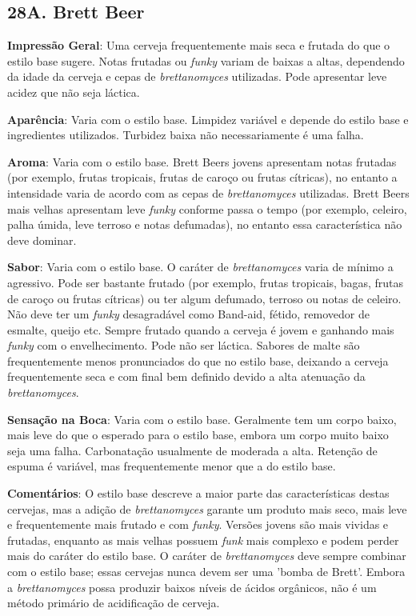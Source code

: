 \subsection*{28A. Brett Beer}

\textbf{Impressão Geral}: Uma cerveja frequentemente mais seca e frutada do que o estilo base sugere. Notas frutadas ou \textit{funky} variam de baixas a altas, dependendo da idade da cerveja e cepas de \textit{brettanomyces} utilizadas. Pode apresentar leve acidez que não seja láctica.

\textbf{Aparência}: Varia com o estilo base. Limpidez variável e depende do estilo base e ingredientes utilizados. Turbidez baixa não necessariamente é uma falha.

\textbf{Aroma}: Varia com o estilo base. Brett Beers jovens apresentam notas frutadas (por exemplo, frutas tropicais, frutas de caroço ou frutas cítricas), no entanto a intensidade varia de acordo com as cepas de \textit{brettanomyces} utilizadas. Brett Beers mais velhas apresentam leve \textit{funky} conforme passa o tempo (por exemplo, celeiro, palha úmida, leve terroso e notas defumadas), no entanto essa característica não deve dominar.

\textbf{Sabor}: Varia com o estilo base. O caráter de \textit{brettanomyces} varia de mínimo a agressivo. Pode ser bastante frutado (por exemplo, frutas tropicais, bagas, frutas de caroço ou frutas cítricas) ou ter algum defumado, terroso ou notas de celeiro. Não deve ter um \textit{funky} desagradável como Band-aid, fétido, removedor de esmalte, queijo etc. Sempre frutado quando a cerveja é jovem e ganhando mais \textit{funky} com o envelhecimento. Pode não ser láctica. Sabores de malte são frequentemente menos pronunciados do que no estilo base, deixando a cerveja frequentemente seca e com final bem definido devido a alta atenuação da \textit{brettanomyces}.

\textbf{Sensação na Boca}: Varia com o estilo base. Geralmente tem um corpo baixo, mais leve do que o esperado para o estilo base, embora um corpo muito baixo seja uma falha. Carbonatação usualmente de moderada a alta. Retenção de espuma é variável, mas frequentemente menor que a do estilo base.

\textbf{Comentários}: O estilo base descreve a maior parte das características destas cervejas, mas a adição de \textit{brettanomyces} garante um produto mais seco, mais leve e frequentemente mais frutado e com \textit{funky}. Versões jovens são mais vividas e frutadas, enquanto as mais velhas possuem \textit{funk} mais complexo e podem perder mais do caráter do estilo base. O caráter de \textit{brettanomyces} deve sempre combinar com o estilo base; essas cervejas nunca devem ser uma 'bomba de Brett'. Embora a \textit{brettanomyces} possa produzir baixos níveis de ácidos orgânicos, não é um método primário de acidificação de cerveja.

